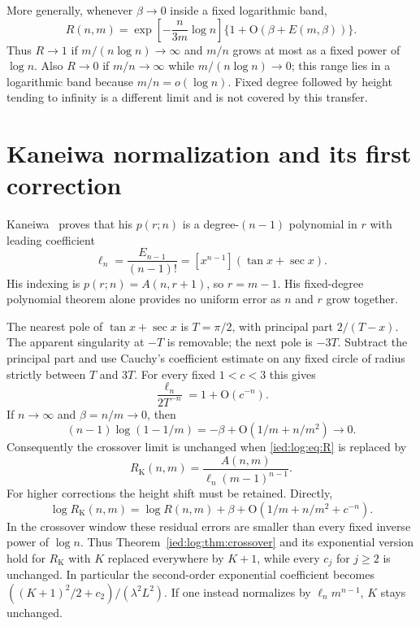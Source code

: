 \documentclass[11pt,letterpaper]{article}
\theoremstyle{remark}\newtheorem{remark}[theorem]{Remark}
\newcommand{\Oh}{\mathrm O}\newcommand{\supp}{\operatorname{supp}}
\begin{document}
More generally, whenever $\beta\to0$ inside a fixed logarithmic band,
\begin{equation}\label{ied:log:eq:generalregime}
 R(n,m)=\exp\left[-\frac{n}{3m}\log n\right]
                \{1+\Oh(\beta+E(m,\beta))\}.
\end{equation}
Thus $R\to1$ if $m/(n\log n)\to\infty$ and $m/n$ grows at most as a fixed power of $\log n$. Also $R\to0$ if $m/n\to\infty$ while $m/(n\log n)\to0$; this range lies in a logarithmic band because $m/n=o(\log n)$. Fixed degree followed by height tending to infinity is a different limit and is not covered by this transfer.

\section{Kaneiwa normalization and its first correction}\label{ied:log:sec:kaneiwa}
Kaneiwa~\cite{Kaneiwa} proves that his $p(r;n)$ is a degree-$(n-1)$ polynomial in $r$ with leading coefficient
\begin{equation}\label{ied:log:eq:ell}
 \ell_n=\frac{E_{n-1}}{(n-1)!}
       =[x^{n-1}](\tan x+\sec x).
\end{equation}
His indexing is $p(r;n)=A(n,r+1)$, so $r=m-1$. His fixed-degree polynomial theorem alone provides no uniform error as $n$ and $r$ grow together.

The nearest pole of $\tan x+\sec x$ is $T=\pi/2$, with principal part $2/(T-x)$. The apparent singularity at $-T$ is removable; the next pole is $-3T$. Subtract the principal part and use Cauchy's coefficient estimate on any fixed circle of radius strictly between $T$ and $3T$. For every fixed $1<c<3$ this gives
\begin{equation}\label{ied:log:eq:ellestimate}
 \frac{\ell_n}{2T^{-n}}=1+\Oh(c^{-n}).
\end{equation}
If $n\to\infty$ and $\beta=n/m\to0$, then
\[
 (n-1)\log(1-1/m)=-\beta+\Oh(1/m+n/m^2)\longrightarrow0.
\]
Consequently the crossover limit is unchanged when \eqref{ied:log:eq:R} is replaced by
\begin{equation}\label{ied:log:eq:Rk}
 R_{\mathrm K}(n,m)=\frac{A(n,m)}{\ell_n(m-1)^{n-1}}.
\end{equation}
For higher corrections the height shift must be retained. Directly,
\begin{equation}\label{ied:log:eq:Kshift}
 \log R_{\mathrm K}(n,m)=\log R(n,m)+\beta
       +\Oh(1/m+n/m^2+c^{-n}).
\end{equation}
In the crossover window these residual errors are smaller than every fixed inverse power of $\log n$. Thus Theorem~\ref{ied:log:thm:crossover} and its exponential version hold for $R_{\mathrm K}$ with $K$ replaced everywhere by $K+1$, while every $c_j$ for $j\ge2$ is unchanged. In particular the second-order exponential coefficient becomes $((K+1)^2/2+c_2)/(\lambda^2L^2)$. If one instead normalizes by $\ell_n m^{n-1}$, $K$ stays unchanged.
\end{document}

